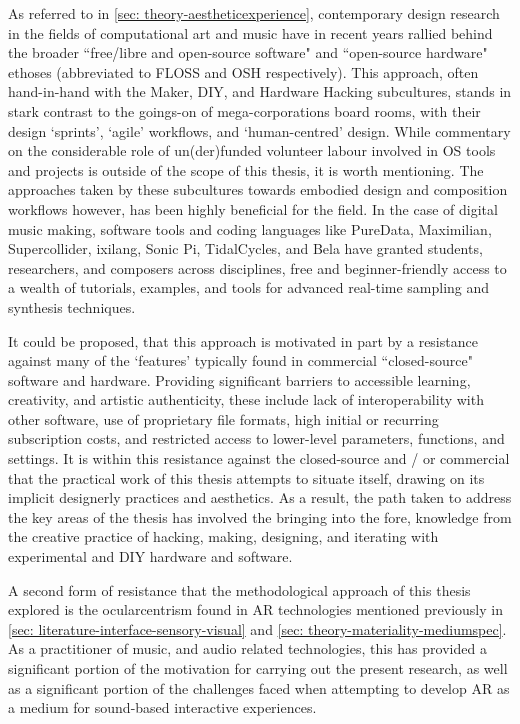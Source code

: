 As referred to in \autoref{sec: theory-aestheticexperience}, contemporary design research in the fields of computational art and music have in recent years rallied behind the broader ``free/libre and open-source software" and ``open-source hardware" ethoses (abbreviated to FLOSS and OSH respectively). This approach, often hand-in-hand with the Maker, DIY, and Hardware Hacking subcultures, stands in stark contrast to the goings-on of mega-corporations board rooms, with their design `sprints', `agile' workflows, and `human-centred' design. While commentary on the considerable role of un(der)funded volunteer labour involved in OS tools and projects is outside of the scope of this thesis, it is worth mentioning. The approaches taken by these subcultures towards embodied design and composition workflows however, has been highly beneficial for the field. In the case of digital music making, software tools and coding languages like PureData, Maximilian, Supercollider, ixilang, Sonic Pi, TidalCycles, and Bela have granted students, researchers, and composers across disciplines, free and beginner-friendly access to a wealth of tutorials, examples, and tools for advanced real-time sampling and synthesis techniques.

It could be proposed, that this approach is motivated in part by a resistance against many of the `features' typically found in commercial ``closed-source" software and hardware. Providing significant barriers to accessible learning, creativity, and artistic authenticity, these include lack of interoperability with other software, use of proprietary file formats, high initial or recurring subscription costs, and restricted access to lower-level parameters, functions, and settings. It is within this resistance against the closed-source and / or commercial that the practical work of this thesis attempts to situate itself, drawing on its implicit designerly practices and aesthetics. As a result, the path taken to address the key areas of the thesis has involved the bringing into the fore, knowledge from the creative practice of hacking, making, designing, and iterating with experimental and DIY hardware and software.

A second form of resistance that the methodological approach of this thesis explored is the ocularcentrism found in AR technologies mentioned previously in \autoref{sec: literature-interface-sensory-visual} and \autoref{sec: theory-materiality-mediumspec}. As a practitioner of music, and audio related technologies, this has provided a significant portion of the motivation for carrying out the present research, as well as a significant portion of the challenges faced when attempting to develop AR as a medium for sound-based interactive experiences.

